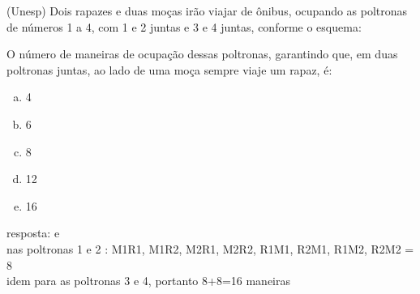 \begin{ex}
 (Unesp) Dois rapazes e duas moças irão viajar de ônibus, ocupando as poltronas de números 1 a 4, com 1 e 2 juntas e 3 e 4 juntas, conforme o esquema:
 \begin{center}
\end{center}
O número de maneiras de ocupação dessas poltronas, garantindo que, em duas poltronas juntas, ao lado de uma moça sempre viaje um rapaz, é:
    \begin{enumerate}[(a)]
    \item 4
    \item 6
    \item 8
    \item 12
    \item 16
    \end{enumerate}
       \begin{sol}
        resposta: e \\
        nas poltronas 1 e 2 : M1R1, M1R2, M2R1,  M2R2,  R1M1,  R2M1,  R1M2,  R2M2 = 8 \\
        idem para as poltronas 3 e 4, portanto 8+8=16 maneiras
        
       \end{sol}
\end{ex}
